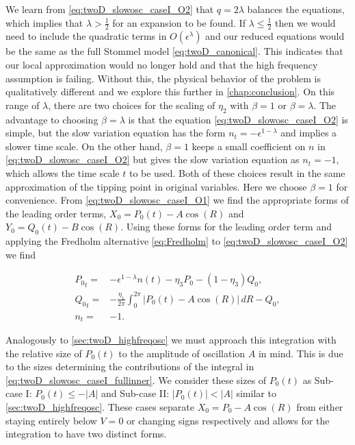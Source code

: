 \indent We learn from \eqref{eq:twoD_slowosc_caseI_O2} that $q= 2\lambda$ balances the equations, which implies that $\lambda> \frac{1}{2}$ for an expansion to be found. If $\lambda\le \frac{1}{2}$ then we would need to include the quadratic terms in $O(\epsilon^\lambda)$ and our reduced equations would be the same as the full Stommel model \eqref{eq:twoD_canonical}. This indicates that our local approximation would no longer hold and that the high frequency assumption is failing. Without this, the physical behavior of the problem is qualitatively different and we explore this further in \autoref{chap:conclusion}. On this range of $\lambda$, there are two choices for the scaling of $\eta_2$ with $\beta=1$ or $\beta=\lambda$. The advantage to choosing $\beta=\lambda$ is that the equation \eqref{eq:twoD_slowosc_caseI_O2} is simple, but the slow variation equation has the form $n_t = -\epsilon^{1-\lambda}$ and implies a slower time scale. On the other hand, $\beta=1$ keeps a small coefficient on $n$ in \eqref{eq:twoD_slowosc_caseI_O2} but gives the slow variation equation as $n_t=-1$, which allows the time scale $t$ to be used. Both of these choices result in the same approximation of the tipping point in original variables. Here we choose $\beta=1$ for convenience. From \eqref{eq:twoD_slowosc_caseI_O1} we find the appropriate forms of the leading order terms, $X_0=P_0(t)-A\cos(R)$ and $Y_0=Q_0(t)-B\cos(R)$. Using these forms for the leading order term and applying the Fredholm alternative \eqref{eq:Fredholm} to \eqref{eq:twoD_slowosc_caseI_O2} we find 

\begin{equation}\label{eq:twoD_slowosc_caseI_fullinner}
\begin{aligned}
{P_0}_t =& -\epsilon^{1-\lambda} n(t) -\eta_3 P_0-(1-\eta_3)Q_0, \\
{Q_0}_t =& -\frac{\eta_1}{2\pi}\int_0^{2\pi}|P_0(t)-A\cos(R)|\,dR-Q_0,\\
n_t =& -1.
\end{aligned}
\end{equation}

\indent Analogously to \autoref{sec:twoD_highfreqosc} we must approach this integration with the relative size of $P_0(t)$ to the amplitude of oscillation $A$ in mind. This is due to the sizes determining the contributions of the integral in \eqref{eq:twoD_slowosc_caseI_fullinner}. We consider these sizes of $P_0(t)$ as Sub-case I: $P_0(t)\le -|A|$ and Sub-case II: $|P_0(t)|<|A|$ similar to \autoref{sec:twoD_highfreqosc}. These cases separate $X_0=P_0-A\cos(R)$ from either staying entirely below $V=0$ or changing signs respectively and allows for the integration to have two distinct forms.

